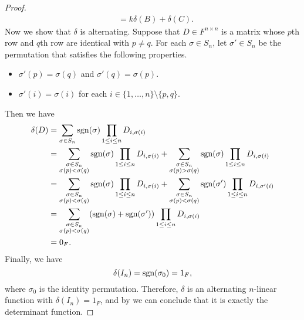 \begin{proof}
\begin{align*}
    &= k\delta(B) + \delta(C).
  \end{align*}
  Now we show that $\delta$ is alternating.
  Suppose that $D \in F^{n \times n}$ is a matrix whose $p$th row and $q$th row
  are identical with $p \neq q$.
  For each $\sigma \in S_n$, let $\sigma' \in S_n$ be the permutation that
  satisfies the following properties.
  \begin{itemize}
    \item $\sigma'(p) = \sigma(q)$ and $\sigma'(q) = \sigma(p)$.
    \item $\sigma'(i) = \sigma(i)$ for each
    $i \in \{1, \dots, n\} \setminus \{p, q\}$.
  \end{itemize}
  Then we have
  \begin{align*}
    \delta(D)
    &= \sum_{\sigma \in S_n} \operatorname{sgn}(\sigma)
    \prod_{1 \leq i \leq n} D_{i,\sigma(i)} \\
    &= \sum_{\substack{\sigma \in S_n \\ \sigma(p) < \sigma(q)}} \operatorname{sgn}(\sigma)
    \prod_{1 \leq i \leq n} D_{i,\sigma(i)}
    + \sum_{\substack{\sigma \in S_n \\ \sigma(p) > \sigma(q)}} \operatorname{sgn}(\sigma)
    \prod_{1 \leq i \leq n} D_{i,\sigma(i)} \\
    &= \sum_{\substack{\sigma \in S_n \\ \sigma(p) < \sigma(q)}} \operatorname{sgn}(\sigma)
    \prod_{1 \leq i \leq n} D_{i,\sigma(i)}
    + \sum_{\substack{\sigma \in S_n \\ \sigma(p) < \sigma(q)}} \operatorname{sgn}(\sigma')
    \prod_{1 \leq i \leq n} D_{i,\sigma'(i)} \\
    &= \sum_{\substack{\sigma \in S_n \\ \sigma(p) < \sigma(q)}}
    (\operatorname{sgn}(\sigma) + \operatorname{sgn}(\sigma')) \prod_{1 \leq i \leq n} D_{i,\sigma(i)} \\
    &= 0_F.
  \end{align*}
  Finally, we have
  \begin{equation*}
    \delta(I_n) = \operatorname{sgn}(\sigma_0) = 1_F,
  \end{equation*}
  where $\sigma_0$ is the identity permutation.
  Therefore, $\delta$ is an alternating $n$-linear function with
  $\delta(I_n) = 1_F$, and by  we can conclude
  that it is exactly the determinant function.
\end{proof}